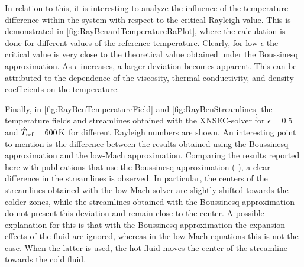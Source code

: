 In relation to this, it is interesting to analyze the influence of the temperature difference within the system with respect to the critical Rayleigh value. This is demonstrated in \cref{fig:RayBenardTemperatureRaPlot}, where the calculation is done for different values of the reference temperature. Clearly, for low $\epsilon$  the critical value is very close to the theoretical value obtained under the Boussinesq approximation. As $\epsilon$ increases, a larger deviation becomes apparent. This can be attributed to the dependence of the viscosity, thermal conductivity, and density coefficients on the temperature. 

Finally, in \cref{fig:RayBenTemperatureField} and \cref{fig:RayBenStreamlines} the temperature fields and streamlines obtained with the XNSEC-solver for $\epsilon = 0.5$ and $\hat T_{\text{ref}} = \SI{600}{\kelvin}$ for different Rayleigh numbers are shown. An interesting point to mention is the difference between the results obtained using the Boussinesq approximation and the low-Mach approximation. Comparing the results reported here with publications that use the Boussinesq approximation ( \textcite{shishkinaRayleighBenardConvectionContainer2021,zhouNumericalSimulationLaminar2004}), a clear difference in the streamlines is observed. In particular, the centers of the streamlines obtained with the low-Mach solver are slightly shifted towards the colder zones, while the streamlines obtained with the Boussinesq approximation do not present this deviation and remain close to the center. A possible explanation for this is that with the Boussinesq approximation the expansion effects of the fluid are ignored, whereas in the low-Mach equations this is not the case. When the latter is used, the hot fluid moves the center of the streamline towards the cold fluid.
